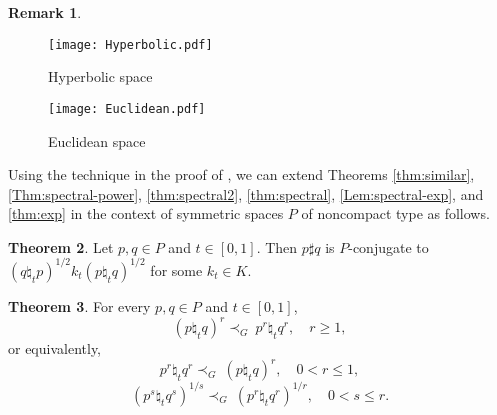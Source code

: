 \documentclass[12pt, reqno]{amsart}
\newcommand{\blue}[1]{\textcolor[rgb]{0.00,0.00,0.80}{#1}}    %
\numberwithin{equation}{section}
\theoremstyle{definition}
\newtheorem{theorem}{Theorem}[section]
\newtheorem{remark}[theorem]{Remark}
\renewcommand{\ge}{\geqslant}
\renewcommand{\le}{\leqslant}
\def\g{\mbox{\germ g}}
\def\p{\mbox{\germ p}}
\begin{document}
\begin{remark}


\begin{figure}[ht]
\texttt{[image: Hyperbolic.pdf]}
\caption{\label{fig:hyperbolic} Hyperbolic space}
\end{figure}


\begin{figure}[ht]
\texttt{[image: Euclidean.pdf]}
\caption{\label{fig:euclidean} Euclidean space}
\end{figure}


\end{remark}

Using the technique in the proof of \cite[Theorem 3.5] {LLT14}, we can extend Theorems \ref{thm:similar}, \ref{Thm:spectral-power}, \ref{thm:spectral2}, \ref{thm:spectral}, \ref{Lem:spectral-exp}, and \ref{thm:exp} in the context of symmetric spaces $P$ of noncompact type as follows. 
\begin{theorem}
Let $p, q \in P$ and $t \in [0, 1]$. Then $p\sharp q$ is $P$-conjugate to $(q\natural_t p)^{1/2} {k_t} (p\natural_t q)^{1/2}$ for some $k_t\in K$. 
\end{theorem}

\begin{theorem}
For every $p, q \in P$ and $t \in [0, 1]$,
\[
(p\natural_t q)^r {\prec_G} \ p^r \natural_t q^r, \quad r\ge 1,
\]
or equivalently,
\[
p^r \natural_t q^r{\prec_G}\ (p\natural_t q)^r ,\quad 0< r\le 1,
\]
\[
(p^s \natural_t q^s)^{1/s}{\prec_G}\ (p^r \natural_t q^r)^{1/r}, \quad 0<s\le r.
\]
\end{theorem}
\end{document}
